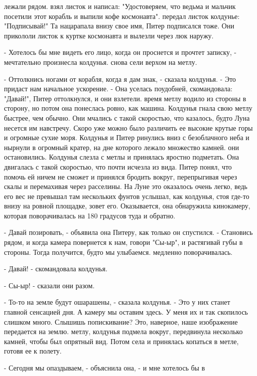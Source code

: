 лежали рядом.
 взял листок и написал: "Удостоверяем, что ведьма и мальчик 
посетили этот корабль и выпили кофе космонавта".
 передал листок колдунье: "Подписывай!" Та нацарапала внизу свое 
имя, Питер подписался тоже. Они прикололи листок к куртке космонавта и 
вылезли через люк наружу.
\par- Хотелось бы мне видеть его лицо, когда он проснется и прочтет 
записку, - мечтательно произнесла колдунья.
 снова сели верхом на метлу.
\par- Оттолкнись ногами от корабля, когда я дам знак, - сказала 
колдунья. - Это придаст нам начальное ускорение. - Она уселась 
поудобней, скомандовала: "Давай!", Питер оттолкнулся, и они взлетели.
 время метлу водило из стороны в сторону, но потом она 
понеслась ровно, как машина. Колдунья гнала свою метлу быстрее, чем 
обычно. Они мчались с такой скоростью, что казалось, будто Луна 
несется им навстречу. Скоро уже можно было различить ее высокие крутые 
горы и огромные сухие моря. Колдунья и Питер ринулись вниз с 
безоблачного неба и нырнули в огромный кратер, на дне которого лежало 
множество камней.
 они остановились. Колдунья слезла с метлы и принялась яростно 
подметать. Она двигалась с такой скоростью, что почти исчезла из вида. 
Питер понял, что помочь ей ничем не сможет и принялся бродить вокруг, 
перепрыгивая через скалы и перемахивая через расселины. На Луне это 
оказалось очень легко, ведь его вес не превышал там нескольких фунтов
 услышал, как колдунья, стоя где-то внизу на ровной площадке, 
зовет его. Оказывается, она обнаружила кинокамеру, которая 
поворачивалась на 180 градусов туда и обратно.
\par- Давай позировать, - объявила она Питеру, как только он 
спустился. - Становись рядом, и когда камера повернется к нам, говори 
"Сы-ыр", и растягивай губы в стороны. Тогда получится, будто мы 
улыбаемся.
 медленно поворачивалась.
\par- Давай! - скомандовала колдунья.
\par- Сы-ыр! - сказали они разом.
\par- То-то на земле будут ошарашены, - сказала колдунья. - Это у них 
станет главной сенсацией дня. А камеру мы оставим здесь. У меня их и 
так скопилось слишком много. Слышишь попискивание? Это, наверное, наше 
изображение передается на землю.
 метлу, колдунья подмела вокруг, передвинула несколько камней, 
чтобы был опрятный вид. Потом села и принялась копаться в метле, 
готовя ее к полету.
\par- Сегодня мы опаздываем, - объяснила она, - и мне хотелось бы в 
